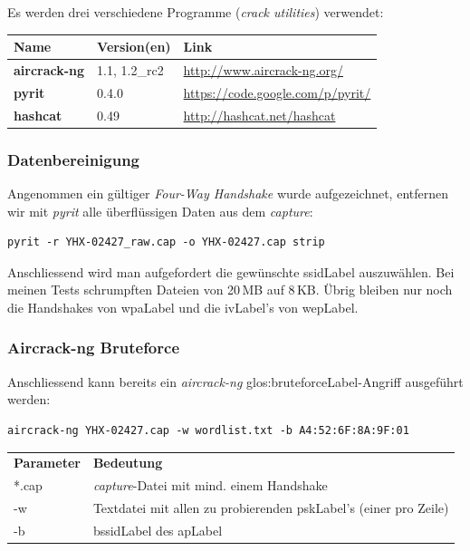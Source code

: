 Es werden drei verschiedene Programme (\textit{crack utilities}) verwendet:
\begin{table}[H]
\small\sffamily\centering\renewcommand{\arraystretch}{1.4}
\begin{tabular}{l l l}
\hline
\rowcolor{tableheadcolor}
  \bfseries Name  &
  \bfseries Version(en) &
  \bfseries Link \\
\hline
  \textbf{aircrack-ng} & 1.1, 1.2\_rc2 & \url{http://www.aircrack-ng.org/}\\
  \textbf{pyrit} & 0.4.0 & \url{https://code.google.com/p/pyrit/}\\
  \textbf{hashcat} & 0.49 & \url{http://hashcat.net/hashcat}\\
\hline
\end{tabular}
\end{table}


\subsubsection{Datenbereinigung}
Angenommen ein gültiger \textit{Four-Way Handshake} wurde aufgezeichnet, entfernen wir mit \textit{pyrit} alle überflüssigen Daten aus dem \textit{capture}:
\begin{lstlisting}[style=lstStyleFramed]
pyrit -r YHX-02427_raw.cap -o YHX-02427.cap strip
\end{lstlisting}
Anschliessend wird man aufgefordert die gewünschte \gls{ssidLabel} auszuwählen.
Bei meinen Tests schrumpften Dateien von 20\,MB auf 8\,KB.
Übrig bleiben nur noch die Handshakes von \gls{wpaLabel} und die \gls{ivLabel}'s von \gls{wepLabel}.

\subsubsection{Aircrack-ng Bruteforce}
Anschliessend kann bereits ein \textit{aircrack-ng} \gls{glos:bruteforceLabel}-Angriff ausgeführt werden:
\begin{lstlisting}[style=lstStyleFramed]
aircrack-ng YHX-02427.cap -w wordlist.txt -b A4:52:6F:8A:9F:01
\end{lstlisting}
\begin{tabular}{l l}
	\textbf{Parameter} & \textbf{Bedeutung}\\
	*.cap & \textit{capture}-Datei mit mind. einem Handshake\\
	-w	& Textdatei mit allen zu probierenden \gls{pskLabel}'s (einer pro Zeile)\\
	-b	& \gls{bssidLabel} des \gls{apLabel}\\
\end{tabular}

